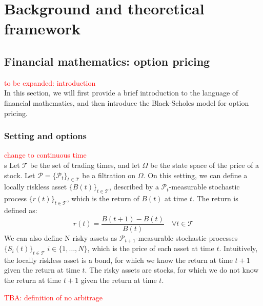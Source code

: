 \chapter{Background and theoretical framework}
\label{ch:background}

\section{Financial mathematics: option pricing}
\label{sec:financial_background}
\textcolor{red}{to be expanded: introduction}\\
In this section, we will first provide a brief introduction to the language of financial mathematics, and then introduce the Black-Scholes model for option pricing.

\subsection{Setting and options}
\textcolor{red}{change to continuous time}\\s
Let $\mathcal{T}$ be the set of trading times, and let $\Omega$ be the state space of the price of a stock. Let $\mathcal{P} = \{\mathcal{P}_t\}_{t\in\mathcal{T}}$ be a filtration on $\Omega$. On this setting, we can define a locally riskless asset $\{B(t)\}_{t\in\mathcal{T}}$, described by a $\mathcal{P}_t$-measurable stochastic process $\{r(t)\}_{t\in\mathcal{T}}$, which is the return of $B(t)$ at time $t$. The return is defined as:
\begin{equation}
    r(t) = \frac{B(t+1)-B(t)}{B(t)} \quad \forall t\in\mathcal{T}
\end{equation}
We can also define N risky assets as $\mathcal{P}_{t+1}$-measurable stochastic processes $\{S_i(t)\}_{t\in\mathcal{T}} \; i\in \{1,\dots,N\}$, which is the price of each asset at time $t$. Intuitively, the locally riskless asset is a bond, for which we know the return at time $t+1$ given the return at time $t$. The risky assets are stocks, for which we do not know the return at time $t+1$ given the return at time $t$.



\textcolor{red}{TBA: definition of no arbitrage}

